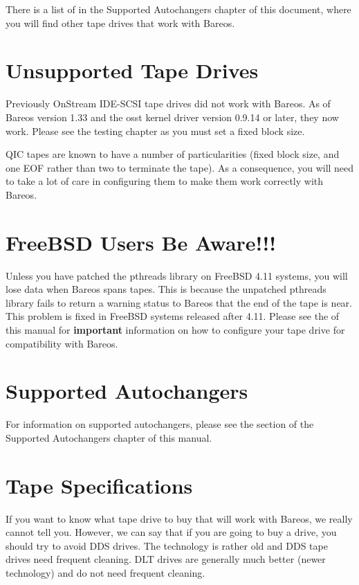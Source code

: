 There is a list of  in the Supported
Autochangers chapter of this document, where you will find other tape drives
that work with Bareos.

\section{Unsupported Tape Drives}
\label{UnSupportedDrives}

Previously OnStream IDE-SCSI tape drives did not work with Bareos. As of
Bareos version 1.33 and the osst kernel driver version 0.9.14 or later, they
now work. Please see the testing chapter as you must set a fixed block size.

QIC tapes are known to have a number of particularities (fixed block size, and
one EOF rather than two to terminate the tape). As a consequence, you will
need to take a lot of care in configuring them to make them work correctly
with Bareos.

\section{FreeBSD Users Be Aware!!!}

Unless you have patched the pthreads library on FreeBSD 4.11 systems, you will
lose data when Bareos spans tapes. This is because the unpatched pthreads
library fails to return a warning status to Bareos that the end of the tape is
near. This problem is fixed in FreeBSD systems released after 4.11. Please see the
 of this manual for
{\bf important} information on how to configure your tape drive for
compatibility with Bareos.

\section{Supported Autochangers}

For information on supported autochangers, please see the
section of the Supported Autochangers chapter of this manual.

\section{Tape Specifications}
If you want to know what tape drive to buy that will work with Bareos,
we really cannot tell you.  However, we can say that if you are going
to buy a drive, you should try to avoid DDS drives. The technology is
rather old and DDS tape drives need frequent cleaning.  DLT drives are
generally much better (newer technology) and do not need frequent
cleaning.

